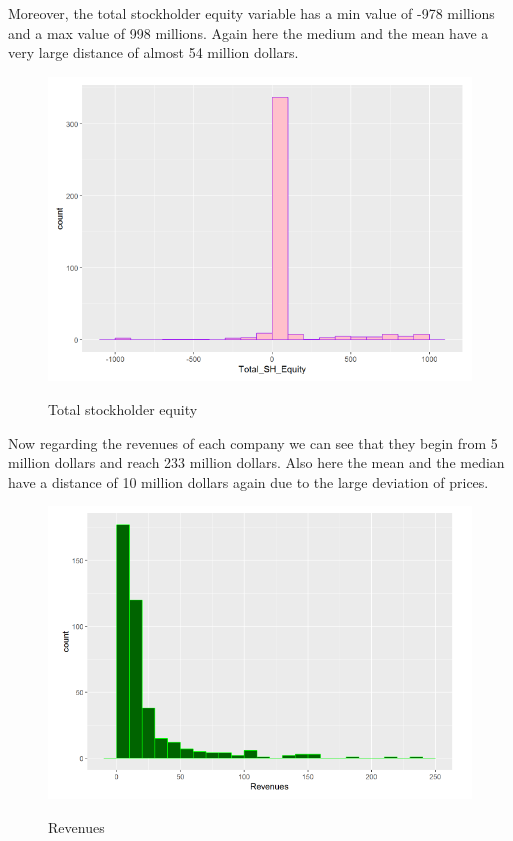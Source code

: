 \documentclass{book}
\begin{document}
Moreover, the total stockholder equity variable has a min value of -978 millions and a max value of 998 millions. Again here the medium and the mean have a very large distance of almost 54 million dollars.\\
\begin{figure}[H]
\centering
\caption{Total stockholder equity}
\begin{center}
\includegraphics[scale=0.35]{../R/photos/4_2_equity.png}  \\
\end{center}
\end{figure}
Now regarding the revenues of each company we can see that they begin from 5 million dollars and reach 233 million dollars. Also here the mean and the median have a distance of 10 million dollars again due to the large deviation of prices.\\
\begin{figure}[H]
\centering
\caption{Revenues}
\begin{center}
\includegraphics[scale=0.35]{../R/photos/4_2_revenues.png}  \\
\end{center}
\end{figure}
\end{document}
